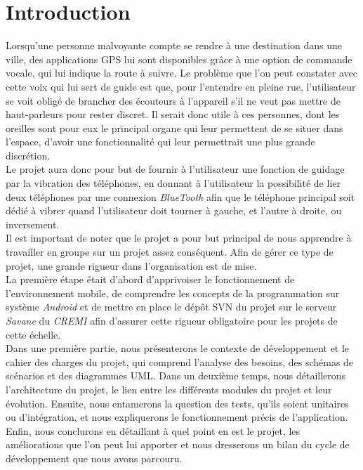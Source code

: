 \chapter*{Introduction}
Lorsqu'une personne malvoyante compte se rendre à une destination dans une ville, des applications GPS lui sont disponibles grâce à une option de commande vocale, qui lui indique la route à suivre. Le problème que l'on peut constater avec cette voix qui lui sert de guide est que, pour l'entendre en pleine rue, l'utilisateur se voit obligé de brancher des écouteurs à l'appareil s'il ne veut pas mettre de haut-parleurs pour rester discret. Il serait donc utile à ces personnes, dont les oreilles sont pour eux le principal organe qui leur permettent de se situer dans l'espace, d'avoir une fonctionnalité qui leur permettrait une plus grande discrétion.\\

Le projet aura donc pour but de fournir à l'utilisateur une fonction de guidage par la vibration des téléphones, en donnant à l'utilisateur la possibilité de lier deux téléphones par une connexion \textit{BlueTooth} afin que le téléphone principal soit dédié à vibrer quand l'utilisateur doit tourner à gauche, et l'autre à droite, ou inversement.\\

Il est important de noter que le projet a pour but principal de nous apprendre à travailler en groupe sur un projet assez conséquent. Afin de gérer ce type de projet, une grande rigueur dans l'organisation est de mise.\\

La première étape était d'abord d'apprivoiser le fonctionnement de l'environnement mobile, de comprendre les concepts de la programmation sur système \textit{Android} et de mettre en place le dépôt SVN du projet sur le serveur \textit{Savane} du \textit{CREMI} afin d'assurer cette rigueur obligatoire pour les projets de cette échelle.\\

Dans une première partie, nous présenterons le contexte de développement et le cahier des charges du projet, qui comprend l'analyse des besoins, des schémas de scénarios et des diagrammes UML.
Dans un deuxième temps, nous détaillerons l'architecture du projet, le lien entre les différents modules du projet et leur évolution.
Ensuite, nous entamerons la question des tests, qu'ils soient unitaires ou d'intégration, et nous expliquerons le fonctionnement précis de l'application. Enfin, nous conclurons en détaillant à quel point en est le projet, les améliorations que l'on peut lui apporter et nous dresserons un bilan du cycle de développement que nous avons parcouru.